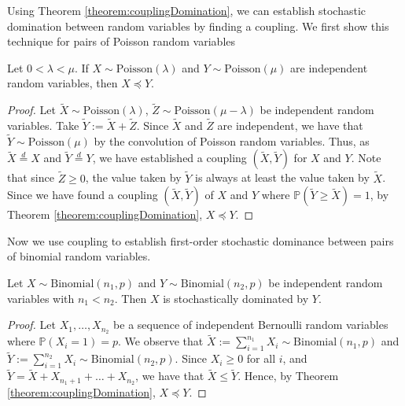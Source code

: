 Using Theorem \ref{theorem:couplingDomination}, we can establish stochastic domination between random variables by finding a coupling. We first show this technique	for pairs of Poisson random variables

\begin{theorem}\label{theorem:poissonDomination}
	Let $0 < \lambda < \mu$. If $X \sim \text{Poisson}(\lambda)$ and $Y \sim \text{Poisson}(\mu)$ are independent random variables, then $X \preceq Y$. 
\end{theorem}

\begin{proof}
	Let $\tilde{X} \sim \text{Poisson}(\lambda)$, $\tilde{Z} \sim \text{Poisson}(\mu - \lambda)$ be independent random variables. Take $\tilde{Y} := \tilde{X} + \tilde{Z}$. Since $\tilde{X}$ and $\tilde{Z}$ are independent, we have that $\tilde{Y} \sim \text{Poisson}(\mu)$ by the convolution of Poisson random variables. Thus, as $\tilde{X} \stackrel{d}{=} X$ and $\tilde{Y} \stackrel{d}{=} Y $, we have established a coupling $(\tilde{X}, \tilde{Y})$ for $X$ and $Y$. Note that since $\tilde{Z} \geq 0$, the value taken by $\tilde{Y}$ is always at least the value taken by $\tilde{X}$. Since we have found a coupling $(\tilde{X}, \tilde{Y})$ of $X$ and $Y$ where $\mathbb{P}(\tilde{Y} \geq \tilde{X}) = 1$, by Theorem \ref{theorem:couplingDomination}, $X \preceq Y$.
\end{proof}

Now we use coupling to establish first-order stochastic dominance between pairs of binomial random variables.

\begin{theorem}\label{theorem:binomialDomination}
	Let $X \sim \text{Binomial}(n_1, p)$ and $Y \sim \text{Binomial}(n_2, p)$ be independent random variables with $n_1 < n_2$. Then $X$ is stochastically dominated by $Y$.
\end{theorem}

\begin{proof}
	Let $X_1, \dots, X_{n_2}$ be a sequence of independent Bernoulli random variables where $\mathbb{P}(X_i = 1) = p$. We observe that $\tilde{X} := \sum_{i=1}^{n_1} X_i \sim \text{Binomial}(n_1, p)$ and $\tilde{Y} := \sum_{i=1}^{n_2} X_i \sim \text{Binomial}(n_2, p)$. Since $X_i \geq 0$ for all $i$, and $\tilde{Y} = \tilde{X} + X_{n_1 + 1} + \dots + X_{n_2}$, we have that $\tilde{X} \leq \tilde{Y}$. Hence, by Theorem \ref{theorem:couplingDomination}, $X \preceq Y$.
\end{proof}
